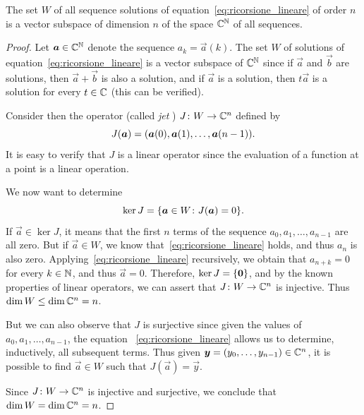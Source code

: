 \begin{theorem}
\label{th:dimensione_ricorsione_lineare}
The set $W$ of all sequence solutions of equation~\eqref{eq:ricorsione_lineare}
of order $n$
is a vector subspace of dimension $n$
of the space ${\mathbb C}^{\mathbb N}$ of all sequences.
\end{theorem}
%
\begin{proof}
Let $\boldsymbol a \in {\mathbb C}^{\mathbb N}$ denote the sequence $a_k = \vec a(k)$.
The set $W$ of solutions of equation~\eqref{eq:ricorsione_lineare}
is a vector subspace of ${\mathbb C}^{\mathbb N}$ since if $\vec a$
and $\vec b$ are solutions, then $\vec a + \vec b$ is also a solution, and if
$\vec a$
is a solution, then $t \vec a$ is a solution for every $t\in {\mathbb C}$
(this can be verified).

Consider then the operator (called \emph{jet}%
) $J\colon W \to {\mathbb C}^n$
defined by
\[
  J(\boldsymbol a) = {\left( \boldsymbol a(0), \boldsymbol a(1), \dots, \boldsymbol a(n-1) \right)}.
\]
It is easy to verify that $J$ is a linear operator since the evaluation
of a function at a point is a linear operation.

We now want to determine
\[
  \ker J = {\left\{ \boldsymbol a \in W \colon J(\boldsymbol a)=0 \right\}}.
\]
If $\vec a\in \ker J$, it means that the first $n$ terms
of the sequence
$a_0, a_1, \dots, a_{n-1}$ are all zero.
But if $\vec a\in W$, we know that~\eqref{eq:ricorsione_lineare} holds, and thus
$a_n$ is also zero. Applying~\eqref{eq:ricorsione_lineare} recursively,
we obtain that $a_{n+k}=0$ for every $k\in {\mathbb N}$, and thus $\vec a = 0$.
Therefore, $\ker J = {\left\{ \boldsymbol 0 \right\}}$,
and by the known properties of linear operators, we can
assert that $J\colon W \to {\mathbb C}^n$ is injective.
Thus $\dim W \le \dim {\mathbb C}^n = n$.

But we can also observe that $J$ is surjective since
given the values of $a_0,a_1, \dots, a_{n-1}$, the equation
~\eqref{eq:ricorsione_lineare} allows us to determine,
inductively, all subsequent terms. Thus
given $\boldsymbol y = (y_0, \dots, y_{n-1}) \in {\mathbb C}^n$,
it is possible to find $\vec a \in W$ such that $J(\vec a) = \vec y$.

Since $J\colon W\to{\mathbb C}^n$ is injective and surjective,
we conclude that $\dim W = \dim {\mathbb C}^n = n$.
\end{proof}

